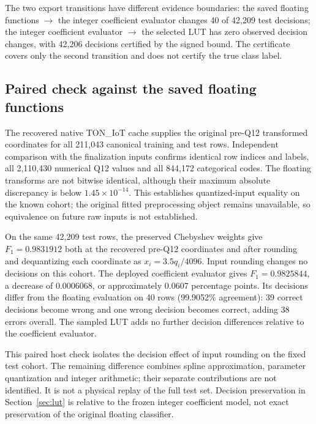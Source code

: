 \documentclass{ieeeaccess}
\begin{document}


The two export transitions have different evidence boundaries: the saved floating functions $\longrightarrow$ the integer coefficient evaluator changes 40 of 42,209 test decisions; the integer coefficient evaluator $\longrightarrow$ the selected LUT has zero observed decision changes, with 42,206 decisions certified by the signed bound. The certificate covers only the second transition and does not certify the true class label.

\subsection{Paired check against the saved floating functions}
The recovered native TON\_IoT cache supplies the original pre-Q12 transformed coordinates for all 211,043 canonical training and test rows. Independent comparison with the finalization inputs confirms identical row indices and labels, all 2,110,430 numerical Q12 values and all 844,172 categorical codes. The floating transforms are not bitwise identical, although their maximum absolute discrepancy is below $1.45\times10^{-14}$. This establishes quantized-input equality on the known cohort; the original fitted preprocessing object remains unavailable, so equivalence on future raw inputs is not established.

On the same 42,209 test rows, the preserved Chebyshev weights give $F_1=0.9831912$ both at the recovered pre-Q12 coordinates and after rounding and dequantizing each coordinate as $x_i=3.5q_i/4096$. Input rounding changes no decisions on this cohort. The deployed coefficient evaluator gives $F_1=0.9825844$, a decrease of $0.0006068$, or approximately 0.0607 percentage points. Its decisions differ from the floating evaluation on 40 rows (99.9052\% agreement): 39 correct decisions become wrong and one wrong decision becomes correct, adding 38 errors overall. The sampled LUT adds no further decision differences relative to the coefficient evaluator.

This paired host check isolates the decision effect of input rounding on the fixed test cohort. The remaining difference combines spline approximation, parameter quantization and integer arithmetic; their separate contributions are not identified. It is not a physical replay of the full test set. Decision preservation in Section~\ref{sec:lut} is relative to the frozen integer coefficient model, not exact preservation of the original floating classifier.
\end{document}
